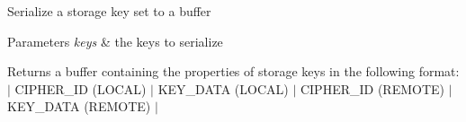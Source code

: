 Serialize a storage key set to a buffer


\begin{DoxyParams}{Parameters}
{\em keys} & the keys to serialize \\
\hline
\end{DoxyParams}
\begin{DoxyReturn}{Returns}
a buffer containing the properties of storage keys in the following format\+: $\vert$ C\+I\+P\+H\+E\+R\+\_\+\+ID (L\+O\+C\+AL) $\vert$ K\+E\+Y\+\_\+\+D\+A\+TA (L\+O\+C\+AL) $\vert$ C\+I\+P\+H\+E\+R\+\_\+\+ID (R\+E\+M\+O\+TE) $\vert$ K\+E\+Y\+\_\+\+D\+A\+TA (R\+E\+M\+O\+TE) $\vert$ 
\end{DoxyReturn}
